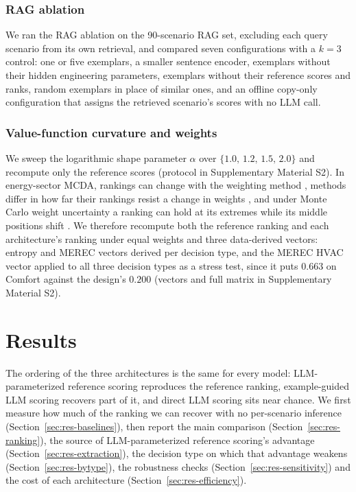 \documentclass[final,3p,times]{elsarticle}
\begin{document}
\subsubsection{RAG ablation}
\label{sec:rag-ablation-methods}
We ran the RAG ablation on the 90-scenario RAG set, excluding each query scenario from its own retrieval, and compared seven configurations with a $k=3$ control: one or five exemplars, a smaller sentence encoder, exemplars without their hidden engineering parameters, exemplars without their reference scores and ranks, random exemplars in place of similar ones, and an offline copy-only configuration that assigns the retrieved scenario's scores with no LLM call.

\subsubsection{Value-function curvature and weights}
\label{sec:sensitivity-methods}
We sweep the logarithmic shape parameter $\alpha$ over $\{1.0,\,1.2,\,1.5,\,2.0\}$ and recompute only the reference scores (protocol in Supplementary Material S2). In energy-sector MCDA, rankings can change with the weighting method \cite{sahin2021weighting}, methods differ in how far their rankings resist a change in weights \cite{sahabuddin2021robustness}, and under Monte Carlo weight uncertainty a ranking can hold at its extremes while its middle positions shift \cite{heymann2026ai}. We therefore recompute both the reference ranking and each architecture's ranking under equal weights and three data-derived vectors: entropy and MEREC vectors derived per decision type, and the MEREC HVAC vector applied to all three decision types as a stress test, since it puts $0.663$ on Comfort against the design's $0.200$ (vectors and full matrix in Supplementary Material S2).

\FloatBarrier
\section{Results}
\label{sec:results}
The ordering of the three architectures is the same for every model: LLM-parameterized reference scoring reproduces the reference ranking, example-guided LLM scoring recovers part of it, and direct LLM scoring sits near chance. We first measure how much of the ranking we can recover with no per-scenario inference (Section~\ref{sec:res-baselines}), then report the main comparison (Section~\ref{sec:res-ranking}), the source of LLM-parameterized reference scoring's advantage (Section~\ref{sec:res-extraction}), the decision type on which that advantage weakens (Section~\ref{sec:res-bytype}), the robustness checks (Section~\ref{sec:res-sensitivity}) and the cost of each architecture (Section~\ref{sec:res-efficiency}).
\end{document}
